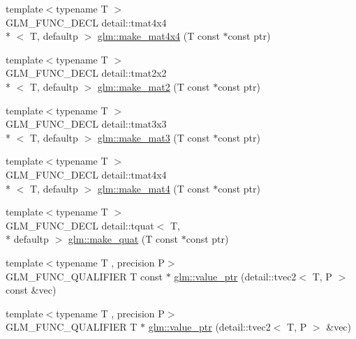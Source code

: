 \begin{DoxyCompactItemize}
\item 
{\footnotesize template$<$typename T $>$ }\\G\-L\-M\-\_\-\-F\-U\-N\-C\-\_\-\-D\-E\-C\-L detail\-::tmat4x4\\*
$<$ T, defaultp $>$ \hyperlink{group__gtc__type__ptr_ga4b13ff6840a66d032724a9a1db50f704}{glm\-::make\-\_\-mat4x4} (T const $\ast$const ptr)
\item 
{\footnotesize template$<$typename T $>$ }\\G\-L\-M\-\_\-\-F\-U\-N\-C\-\_\-\-D\-E\-C\-L detail\-::tmat2x2\\*
$<$ T, defaultp $>$ \hyperlink{group__gtc__type__ptr_ga903422b2c346cbaccad3153a5a1f404c}{glm\-::make\-\_\-mat2} (T const $\ast$const ptr)
\item 
{\footnotesize template$<$typename T $>$ }\\G\-L\-M\-\_\-\-F\-U\-N\-C\-\_\-\-D\-E\-C\-L detail\-::tmat3x3\\*
$<$ T, defaultp $>$ \hyperlink{group__gtc__type__ptr_gae50ecac46eb8771fb074e310b602bf53}{glm\-::make\-\_\-mat3} (T const $\ast$const ptr)
\item 
{\footnotesize template$<$typename T $>$ }\\G\-L\-M\-\_\-\-F\-U\-N\-C\-\_\-\-D\-E\-C\-L detail\-::tmat4x4\\*
$<$ T, defaultp $>$ \hyperlink{group__gtc__type__ptr_gac3920fd61f0c459a4749b8eb9107982c}{glm\-::make\-\_\-mat4} (T const $\ast$const ptr)
\item 
{\footnotesize template$<$typename T $>$ }\\G\-L\-M\-\_\-\-F\-U\-N\-C\-\_\-\-D\-E\-C\-L detail\-::tquat$<$ T, \\*
defaultp $>$ \hyperlink{group__gtc__type__ptr_ga051ec24a44af31a08b11eccbf8726b02}{glm\-::make\-\_\-quat} (T const $\ast$const ptr)
\item 
{\footnotesize template$<$typename T , precision P$>$ }\\G\-L\-M\-\_\-\-F\-U\-N\-C\-\_\-\-Q\-U\-A\-L\-I\-F\-I\-E\-R T const $\ast$ \hyperlink{group__gtc__type__ptr_gac57a976f59e794e6406ecf2924a18f4e}{glm\-::value\-\_\-ptr} (detail\-::tvec2$<$ T, P $>$ const \&vec)
\item 
{\footnotesize template$<$typename T , precision P$>$ }\\G\-L\-M\-\_\-\-F\-U\-N\-C\-\_\-\-Q\-U\-A\-L\-I\-F\-I\-E\-R T $\ast$ \hyperlink{group__gtc__type__ptr_gac2a64387090621acf7176b63f31b70a2}{glm\-::value\-\_\-ptr} (detail\-::tvec2$<$ T, P $>$ \&vec)
\item 

\end{DoxyCompactItemize}
